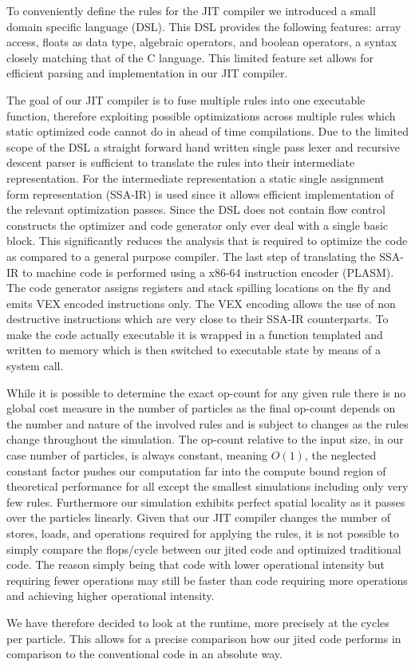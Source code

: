 To conveniently define the rules for the JIT compiler we introduced a small domain specific language (DSL). This DSL provides the following features: array access, floats as data type, algebraic operators, and boolean operators, a syntax closely matching that of the C language. This limited feature set allows for efficient parsing and implementation in our JIT compiler.

The goal of our JIT compiler is to fuse multiple rules into one executable function, therefore exploiting possible optimizations across multiple rules which static optimized code cannot do in ahead of time compilations. Due to the limited scope of the DSL a straight forward hand written single pass lexer and recursive descent parser is sufficient to translate the rules into their intermediate representation. For the intermediate representation a static single assignment form representation (SSA-IR)\cite[Chapter~6.2.4]{dragon}\cite{LuaJITir} is used since it allows efficient implementation of the relevant optimization passes. Since the DSL does not contain flow control constructs the optimizer and code generator only ever deal with a single basic block. This significantly reduces the analysis that is required to optimize the code as compared to a general purpose compiler. The last step of translating the SSA-IR to machine code is performed using a x86-64 instruction encoder (PLASM). The code generator assigns registers and stack spilling locations on the fly and emits VEX encoded instructions only. The VEX encoding allows the use of non destructive instructions which are very close to their SSA-IR counterparts. To make the code actually executable it is wrapped in a function templated and written to memory which is then switched to executable state by means of a system call.


While it is possible to determine the exact op-count for any given rule there is no global cost measure in the number of particles as the final op-count depends on the number and nature of the involved rules and is subject to changes as the rules change throughout the simulation. The op-count relative to the input size, in our case number of particles, is always constant, meaning $O(1)$, the neglected constant factor pushes our computation far into the compute bound region of theoretical performance for all except the smallest simulations including only very few rules. Furthermore our simulation exhibits perfect spatial locality as it passes over the particles linearly.
Given that our JIT compiler changes the number of stores, loads, and operations required for applying the rules, it is not possible to simply compare the flops/cycle between our jited code and optimized traditional code. The reason simply being that code with lower operational intensity but requiring fewer operations may still be faster than code requiring more operations and achieving higher operational intensity.

We have therefore decided to look at the runtime, more precisely at the cycles per particle. This allows for a precise comparison how our jited code performs in comparison to the conventional code in an absolute way.
